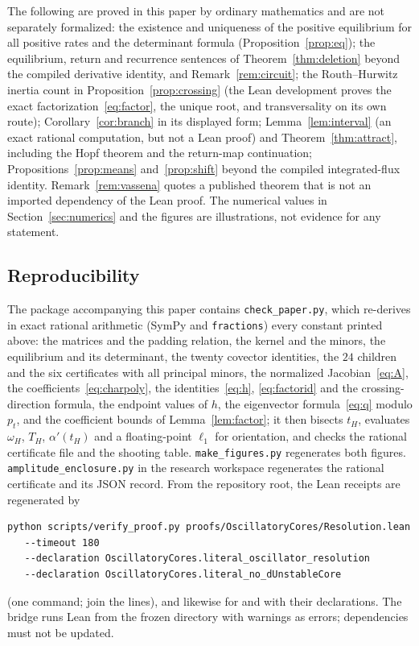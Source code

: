 \documentclass[11pt,a4paper]{article}
\theoremstyle{plain}
\theoremstyle{definition}
\theoremstyle{remark}
\begin{document}
The following are proved in this paper by ordinary mathematics and are not separately formalized: the existence and uniqueness of the positive equilibrium for all positive rates and the determinant formula (Proposition~\ref{prop:eq}); the equilibrium, return and recurrence sentences of Theorem~\ref{thm:deletion} beyond the compiled derivative identity, and Remark~\ref{rem:circuit}; the Routh--Hurwitz inertia count in Proposition~\ref{prop:crossing} (the Lean development proves the exact factorization~\eqref{eq:factor}, the unique root, and transversality on its own route); Corollary~\ref{cor:branch} in its displayed form; Lemma~\ref{lem:interval} (an exact rational computation, but not a Lean proof) and Theorem~\ref{thm:attract}, including the Hopf theorem and the return-map continuation; Propositions~\ref{prop:means} and~\ref{prop:shift} beyond the compiled integrated-flux identity. Remark~\ref{rem:vassena} quotes a published theorem that is not an imported dependency of the Lean proof. The numerical values in Section~\ref{sec:numerics} and the figures are illustrations, not evidence for any statement.

\subsection{Reproducibility}

The package accompanying this paper contains \texttt{check\_paper.py}, which re-derives in exact rational arithmetic (SymPy and \texttt{fractions}) every constant printed above: the matrices and the padding relation, the kernel and the minors, the equilibrium and its determinant, the twenty covector identities, the $24$ children and the six certificates with all principal minors, the normalized Jacobian~\eqref{eq:A}, the coefficients~\eqref{eq:charpoly}, the identities~\eqref{eq:h}, \eqref{eq:factorid} and the crossing-direction formula, the endpoint values of $h$, the eigenvector formula~\eqref{eq:q} modulo $p_t$, and the coefficient bounds of Lemma~\ref{lem:factor}; it then bisects $t_H$, evaluates $\omega_H$, $T_H$, $\alpha'(t_H)$ and a floating-point $\ell_1$ for orientation, and checks the rational certificate file and the shooting table. \texttt{make\_figures.py} regenerates both figures. \texttt{amplitude\_enclosure.py} in the research workspace regenerates the rational certificate and its JSON record. From the repository root, the Lean receipts are regenerated by
\begin{verbatim}
python scripts/verify_proof.py proofs/OscillatoryCores/Resolution.lean
   --timeout 180
   --declaration OscillatoryCores.literal_oscillator_resolution
   --declaration OscillatoryCores.literal_no_dUnstableCore
\end{verbatim}
(one command; join the lines), and likewise for  and  with their declarations. The bridge runs Lean from the frozen  directory with warnings as errors; dependencies must not be updated.
\end{document}
